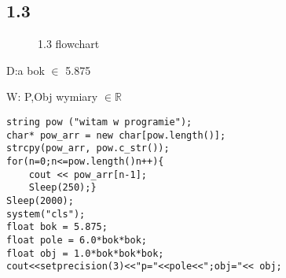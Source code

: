 \documentclass[a4paper,11pt]{article}
\begin{document}
\subsection*{1.3}
\begin{multicols}{2}
  \begin{flushleft}
    \begin{figure}[H]
    \centering  
{}
    \caption{1.3 flowchart}
    \label{flow3}
\end{figure}
    \end{flushleft}
D:a bok $\in$ {5.875} 

W: P,Obj wymiary $\in  \mathbb{R}$
    \begin{flushright}
    \begin{verbatim}
string pow ("witam w programie");
char* pow_arr = new char[pow.length()];
strcpy(pow_arr, pow.c_str());
for(n=0;n<=pow.length()n++){
    cout << pow_arr[n-1];
    Sleep(250);}
Sleep(2000);
system("cls");
float bok = 5.875;
float pole = 6.0*bok*bok;
float obj = 1.0*bok*bok*bok;
cout<<setprecision(3)<<"p="<<pole<<";obj="<< obj;
\end{verbatim}
    \end{flushright}
\end{multicols}

\pagebreak
\end{document}
